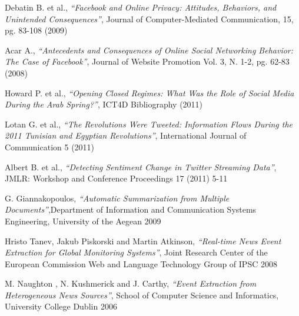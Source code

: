 \documentclass[a4paper]{article}
\begin{document}
\begin{thebibliography}{9}
Debatin B. et al., \emph{``Facebook and Online Privacy: Attitudes, Behaviors,
and Unintended Consequences''}, Journal of Computer-Mediated Communication,
15, pg. 83-108 (2009)

Acar A., \emph{``Antecedents and Consequences of Online Social Networking
Behavior: The Case of Facebook''}, Journal of Website Promotion Vol. 3, N.
1-2, pg. 62-83 (2008)

Howard P. et al., \emph{``Opening Closed Regimes: What Was the Role of Social Media
During the Arab Spring?''}, ICT4D Bibliography (2011)

Lotan G. et al., \emph{``The Revolutions Were Tweeted: Information Flows During
the 2011 Tunisian and Egyptian Revolutions''}, International Journal of
Communication 5 (2011)

Albert B. et al., \emph{``Detecting Sentiment Change in Twitter Streaming
	Data''}, JMLR: Workshop and Conference Proceedings 17 (2011) 5-11
	
G. Giannakopoulos, \emph{``Automatic Summarization from Multiple
Documents''},Department of Information and Communication Systems Engineering, University of the Aegean 2009

Hristo Tanev, Jakub Piskorski and Martin Atkinson, \emph{``Real-time News Event Extraction for Global Monitoring Systems''}, Joint Research Center of the European Commission Web and Language Technology Group of IPSC 2008

M. Naughton , N. Kushmerick and J. Carthy, \emph{``Event Extraction from Heterogeneous News Sources''}, School of Computer Science and Informatics, University College Dublin 2006

\end{thebibliography}
\end{document}
